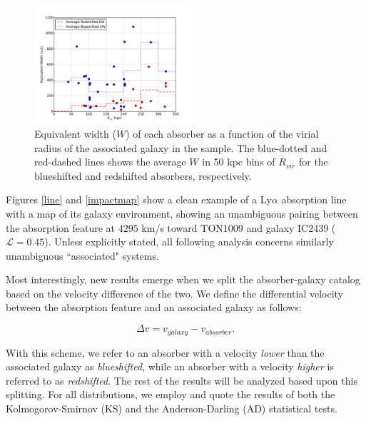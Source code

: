 \documentclass[iop]{emulateapj-rtx4}
\begin{document}
\begin{figure}[h!]
        \centering
        \includegraphics[width=0.52\textwidth]{W(vir)_avgHistograms.pdf}
        \caption{\small{Equivalent width ($W$) of each absorber as a function of the virial radius of the associated galaxy in the sample. The blue-dotted and red-dashed lines shows the average $W$ in 50 kpc bins of $R_{vir}$ for the blueshifted and redshifted absorbers, respectively.}}
        \label{w_vir}
        \vspace{2pt}
\end{figure} 


Figures \ref{line} and \ref{impactmap} show a clean example of a Ly$\alpha$ absorption line with a map of its galaxy environment, showing an unambiguous pairing between the absorption feature at $4295$ km/s toward TON1009 and galaxy IC2439 ($\mathcal{L} = 0.45$). Unless explicitly stated, all following analysis concerns similarly unambiguous ``associated" systems.


Most interestingly, new results emerge when we split the absorber-galaxy catalog based on the velocity difference of the two. We define the differential velocity between the absorption feature and an associated galaxy as follows:

\begin{equation}
	\Delta v = v_{galaxy} - v_{absorber}.
\end{equation}

With this scheme, we refer to an absorber with a velocity \textit{lower} than the associated galaxy as \textit{blueshifted}, while an absorber with a velocity \textit{higher} is referred to as \textit{redshifted}. The rest of the results will be analyzed based upon this splitting. For all distributions, we employ and quote the results of both the Kolmogorov-Smirnov (KS) and the Anderson-Darling (AD) statistical tests.
\end{document}
